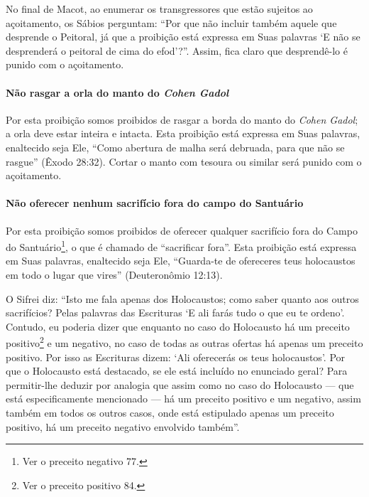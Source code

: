 No final de Macot, ao enumerar os transgressores que estão sujeitos ao
açoitamento, os Sábios perguntam: ``Por que não incluir também aquele
que desprende o Peitoral, já que a proibição está expressa em Suas
palavras `E não se desprenderá o peitoral de cima do efod'?''. Assim,
fica claro que desprendê-lo é punido com o açoitamento.

\paragraph{Não rasgar a orla do manto do \textit{Cohen Gadol}}

Por esta proibição somos proibidos de rasgar a borda do manto do \textit{Cohen
Gadol}; a orla deve estar inteira e intacta. Esta proibição está
expressa em Suas palavras, enaltecido seja Ele, ``Como abertura de malha
será debruada, para que não se rasgue'' (Êxodo 28:32). Cortar o manto
com tesoura ou similar será punido com o açoitamento.

\paragraph{Não oferecer nenhum sacrifício fora do campo do Santuário}

Por esta proibição somos proibidos de oferecer qualquer sacrifício fora
do Campo do Santuário\footnote{Ver o preceito negativo 77.}, o que é chamado de
``sacrificar fora''. Esta proibição está expressa em Suas palavras,
enaltecido seja Ele, ``Guarda-te de ofereceres teus holocaustos em todo
o lugar que vires'' (Deuteronômio 12:13).

O Sifrei diz: ``Isto me fala apenas dos Holocaustos; como saber quanto
aos outros sacrifícios? Pelas palavras das Escrituras `E ali farás tudo
o que eu te ordeno'. Contudo, eu poderia dizer que enquanto no caso do
Holocausto há um preceito positivo\footnote{Ver o preceito positivo 84.} e um negativo,
no caso de todas as outras ofertas há apenas um preceito positivo. Por
isso as Escrituras dizem: `Ali oferecerás os teus holocaustos'. Por que
o Holocausto está destacado, se ele está incluído no enunciado geral?
Para permitir-lhe deduzir por analogia que assim como no caso do
Holocausto --- que está especificamente mencionado --- há um preceito
positivo e um negativo, assim também em todos os outros casos, onde está
estipulado apenas um preceito positivo, há um preceito negativo
envolvido também''.


